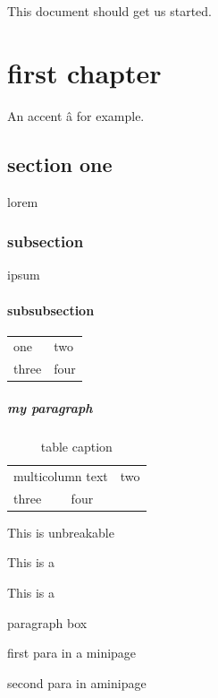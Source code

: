 \documentclass{book}
\begin{document}
This document should get us started.

\chapter{first chapter}

An accent \^a for example.

\section{section one}

\begin{center}
lorem
\end{center}

\subsection{subsection}

\begin{flushright}
ipsum
\end{flushright}

\subsubsection{subsubsection}

\begin{tabular}{ll}
one & two\\
three & four\\
\end{tabular}

\paragraph{my paragraph}

\begin{table}
\caption{table caption}\label{table:label}
\begin{tabular}{ll}
\multicolumn{2}{l}{multicolumn text}
one & two\\
three & four\\
\end{tabular}
\end{table}

This is \mbox{unbreakable}

This is a 

This is a \parbox{4in}{paragraph box}

\begin{minipage}{5in}
first para in a minipage

second para in a\linebreak minipage
\end{minipage}
\end{document}
